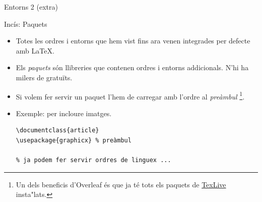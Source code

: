 \begin{frame}[fragile]{Entorns 2 (extra)}
\end{frame}
\begin{frame}[fragile]{Incís: Paquets}

\begin{itemize}
\item Totes les ordres i entorns que hem vist fins ara venen integrades per defecte amb \LaTeX.

\item Els \emph{paquets} són llibreries que contenen ordres i entorns addicionals. N'hi ha milers de gratuïts.

\item Si volem fer servir un paquet l'hem de carregar amb l'ordre
     al \emph{preàmbul} \footnote{Un dels beneficis d'Overleaf és que ja té tots els paquets de \href{https://tug.org/texlive/}{TexLive} insta"lats.}.

\item Exemple:  per incloure imatges.
\begin{verbatim}
\documentclass{article}
\usepackage{graphicx} % preàmbul

% ja podem fer servir ordres de linguex ...

\end{verbatim}
\end{itemize}
\end{frame}

